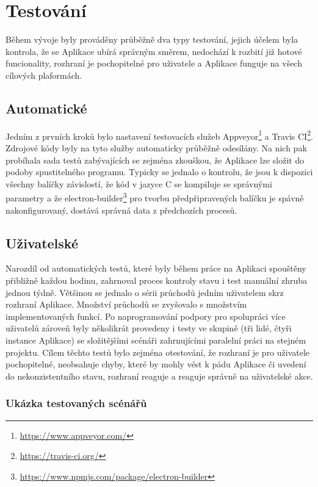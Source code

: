 \chapter{Testování}

Během vývoje byly prováděny průběžně dva typy testování, jejich účelem byla kontrola, že se Aplikace ubírá správným směrem, nedochází k rozbití již hotové funcionality, rozhraní je pochopitelné pro uživatele a Aplikace funguje na všech cílových plaformách.

\section{Automatické}

Jedním z prvních kroků bylo nastavení testovacích služeb Appveyor\footnote{\url{https://www.appveyor.com/}} a Travis CI\footnote{\url{https://travis-ci.org/}}. Zdrojové kódy byly na tyto služby automaticky průběžně odesílány. Na nich pak probíhala sada testů zabývajících se zejména zkouškou, že Aplikace lze složit do podoby spustitelného programu. Typicky se jednalo o kontrolu, že jsou k dispozici všechny balíčky závislostí, že kód v jazyce C se kompiluje se správnými parametry a že electron-builder\footnote{\url{https://www.npmjs.com/package/electron-builder}} pro tvorbu předpřipravených balíčku je spávně nakonfigurovaný, dostává správná data z předchozích procesů.

\section{Uživatelské}

Narozdíl od automatických testů, které byly během práce na Aplikaci spouštěny přibližně každou hodinu, zahrnoval proces kontroly stavu i test manuální zhruba jednou týdně. Většinou se jednalo o sérii průchodů jedním uživatelem skrz rozhraní Aplikace. Množství průchodů se zvyšovalo s množstvím implementovaných funkcí. Po naprogramování podpory pro spolupráci více uživatelů zároveň byly několikrát provedeny i testy ve skupině (tři lidé, čtyři instance Aplikace) se složitějšími scénáři zahrnujícími paralelní práci na stejném projektu. Cílem těchto testů bylo zejména otestování, že rozhraní je pro uživatele pochopitelné, neobsahuje chyby, které by mohly vést k pádu Aplikace či uvedení do nekonzistentního stavu, rozhraní reaguje a reaguje správně na uživatelské akce.

\subsection{Ukázka testovaných scénářů}

